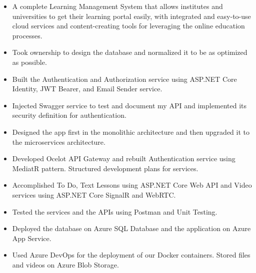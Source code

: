 





\begin{itemize}
    \item A complete Learning Management System that allows institutes and universities to get their learning portal easily, with integrated and easy-to-use cloud services and content-creating tools for leveraging the online education processes.
    \item Took ownership to design the database and normalized it to be as optimized as possible.
    \item Built the Authentication and Authorization service using ASP.NET Core Identity, JWT Bearer, and Email Sender service.
    \item Injected Swagger service to test and document my API and implemented its security definition for authentication.
    \item Designed the app first in the monolithic architecture and then upgraded it to the microservices architecture.
    \item Developed Ocelot API Gateway and rebuilt Authentication service using MediatR pattern. Structured development plans for services.
    \item Accomplished To Do, Text Lessons using ASP.NET Core Web API and Video services using ASP.NET Core SignalR and WebRTC.
    \item Tested the services and the APIs using Postman and Unit Testing.
    \item Deployed the database on Azure SQL Database and the application on Azure App Service.
    \item Used Azure DevOps for the deployment of our Docker containers. Stored files and videos on Azure Blob Storage.
\end{itemize}

\divider

